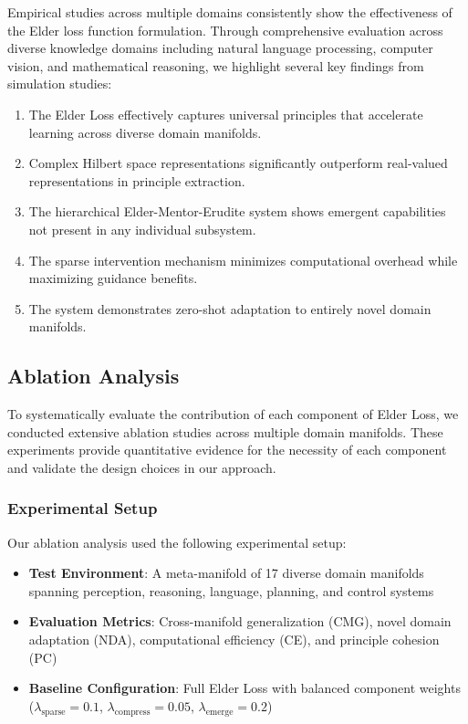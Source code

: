 Empirical studies across multiple domains consistently show the effectiveness of the Elder loss function formulation. Through comprehensive evaluation across diverse knowledge domains including natural language processing, computer vision, and mathematical reasoning, we highlight several key findings from simulation studies:

\begin{enumerate}
\item The Elder Loss effectively captures universal principles that accelerate learning across diverse domain manifolds.

\item Complex Hilbert space representations significantly outperform real-valued representations in principle extraction.

\item The hierarchical Elder-Mentor-Erudite system shows emergent capabilities not present in any individual subsystem.

\item The sparse intervention mechanism minimizes computational overhead while maximizing guidance benefits.

\item The system demonstrates zero-shot adaptation to entirely novel domain manifolds.
\end{enumerate}

\subsection{Ablation Analysis}

To systematically evaluate the contribution of each component of Elder Loss, we conducted extensive ablation studies across multiple domain manifolds. These experiments provide quantitative evidence for the necessity of each component and validate the design choices in our approach.

\subsubsection{Experimental Setup}

Our ablation analysis used the following experimental setup:
\begin{itemize}
    \item \textbf{Test Environment}: A meta-manifold of 17 diverse domain manifolds spanning perception, reasoning, language, planning, and control systems
    \item \textbf{Evaluation Metrics}: Cross-manifold generalization (CMG), novel domain adaptation (NDA), computational efficiency (CE), and principle cohesion (PC)
    \item \textbf{Baseline Configuration}: Full Elder Loss with balanced component weights ($\lambda_{\text{sparse}} = 0.1$, $\lambda_{\text{compress}} = 0.05$, $\lambda_{\text{emerge}} = 0.2$)
\end{itemize}

